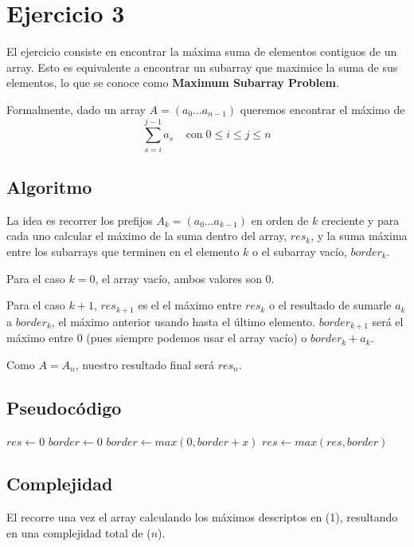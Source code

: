 \section{Ejercicio 3}

El ejercicio consiste en encontrar la máxima suma de elementos contiguos de un array.
Esto es equivalente a encontrar un subarray que maximice la suma de sus elementos,
lo que se conoce como \textbf{Maximum Subarray Problem}.


Formalmente, dado un array $A = (a_0 \ldots a_{n-1})$ queremos encontrar el máximo de
$$
\sum_{s=i}^{j-1} a_s \;\;\;\; \text{con} \; 0 \leq i \leq j \leq n
$$


\subsection{Algoritmo}

La idea es recorrer los prefijos $A_k = (a_0 \ldots a_{k-1})$ en orden de $k$ creciente
y para cada uno calcular el máximo de la suma dentro del array, $res_k$,
y la suma máxima entre los subarrays que terminen en el elemento $k$ o el subarray vacío, $border_k$.

Para el caso $k=0$, el array vacío, ambos valores son 0.

Para el caso $k+1$, $res_{k+1}$ es el el máximo entre $res_k$ o el resultado
de sumarle $a_k$ a $border_k$, el máximo anterior usando hasta el último elemento.
$border_{k+1}$ será el máximo entre 0 (pues siempre podemos usar el array vacío) o $border_k + a_k$.

Como $A = A_n$, nuestro resultado final será $res_n$.

\subsection{Pseudocódigo}

\begin{algorithmic}

    \State $res \gets 0$
    \State $border \gets 0$
        \State $border \gets max(0, border+x)$
        \State $res \gets max(res, border)$
    \EndFor
    \State {}
\EndFunction

\end{algorithmic}

\subsection{Complejidad}

El recorre una vez el array calculando los máximos descriptos en \bigo(1), resultando en una complejidad total de \bigo($n$).

